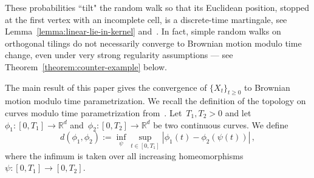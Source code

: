 \documentclass[12pt]{amsart}
\numberwithin{equation}{section}
\newcommand*{\Rd}{\ensuremath{\mathbb{R}^d}}
\begin{document}
 These probabilities ``tilt" the random walk so that 
its Euclidean position, stopped at the first vertex with an incomplete cell, is a discrete-time martingale, see Lemma~\ref{lemma:linear-lie-in-kernel} and~\cite[Proposition 6.4]{MR4425348}. In fact, simple random walks on orthogonal tilings do not necessarily converge to Brownian motion modulo time change, even under very strong regularity assumptions --- see Theorem~\ref{theorem:counter-example} below. 
 

The main result of this paper gives the convergence of $\{X_t\}_{t\geq 0}$ to Brownian motion modulo time parametrization. 
We recall the definition of the topology on curves modulo time parametrization from~\cite[Section 2]{AB1999}.
Let~$T_1,T_2 > 0$ and let~$\phi_1: [0,T_1] \to \Rd$ and~$\phi_2:[0,T_2] \to \Rd$ be two continuous 
curves. We define 
\begin{equation}
	\label{eq:cmp-topology}
	d(\phi_1, \phi_2) := \inf_{\psi} \sup_{t \in [0,T_1]} | \phi_1(t) - \phi_2(\psi(t))| \, , 
\end{equation}
where the infimum is taken over all increasing homeomorphisms~$\psi:[0,T_1] \to [0,T_2]$. 
\end{document}
